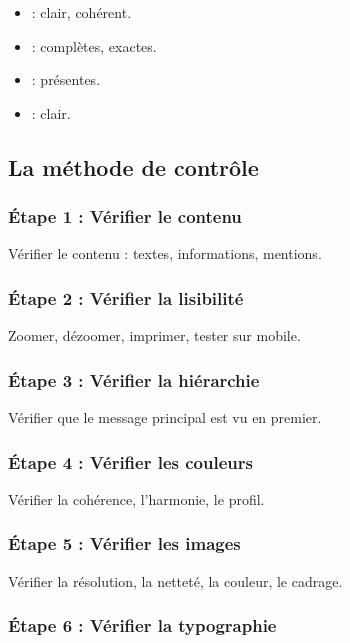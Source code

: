 \begin{itemize}
    \item {} : clair, cohérent.
    \item {} : complètes, exactes.
    \item {} : présentes.
    \item {} : clair.
\end{itemize}

\subsection{La méthode de contrôle}

\subsubsection{Étape 1 : Vérifier le contenu}

Vérifier le contenu : textes, informations, mentions.

\subsubsection{Étape 2 : Vérifier la lisibilité}

Zoomer, dézoomer, imprimer, tester sur mobile.

\subsubsection{Étape 3 : Vérifier la hiérarchie}

Vérifier que le message principal est vu en premier.

\subsubsection{Étape 4 : Vérifier les couleurs}

Vérifier la cohérence, l'harmonie, le profil.

\subsubsection{Étape 5 : Vérifier les images}

Vérifier la résolution, la netteté, la couleur, le cadrage.

\subsubsection{Étape 6 : Vérifier la typographie}

